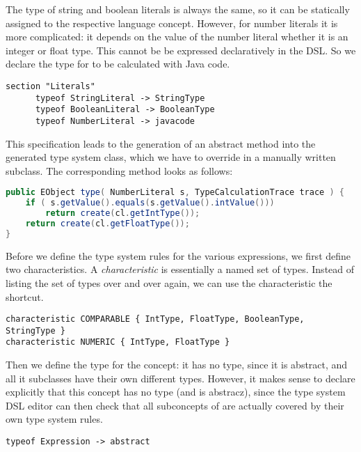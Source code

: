 The type of string and boolean literals is always the same, so it can be
statically assigned to the respective language concept. However, for number
literals it is more complicated: it depends on the value of the number literal
whether it is an integer or float type. This cannot be be expressed
declaratively in the DSL. So we declare the type for  to be
calculated with Java code.

\begin{lstlisting}[language=xts] 
section "Literals"
      typeof StringLiteral -> StringType
      typeof BooleanLiteral -> BooleanType
      typeof NumberLiteral -> javacode
\end{lstlisting}
 
This specification leads to the generation of an abstract method into the
generated type system class, which we have to override in a manually written
subclass. The corresponding method looks as follows:
 
\begin{lstlisting}[language=Java] 
public EObject type( NumberLiteral s, TypeCalculationTrace trace ) {
    if ( s.getValue().equals(s.getValue().intValue()))
        return create(cl.getIntType());
    return create(cl.getFloatType());
} 
\end{lstlisting}


Before we define the type system rules for the various expressions, we first
define two characteristics. A \emph{characteristic} is essentially a named set
of types. Instead of listing the set of types over and over again, we can use the
characteristic the shortcut.

\begin{lstlisting}[language=xts] 
characteristic COMPARABLE { IntType, FloatType, BooleanType, StringType }  
characteristic NUMERIC { IntType, FloatType } 
\end{lstlisting}

Then we define the type for the  concept: it has no type, since
it is abstract, and all it subclasses have their own different types. However,
it makes sense to declare explicitly that this concept has no type (and is
abstracz), since the type system DSL editor can then check that all subconcepts
of  are actually covered by their own type system rules.

\begin{lstlisting}[language=xts]
typeof Expression -> abstract
\end{lstlisting}

